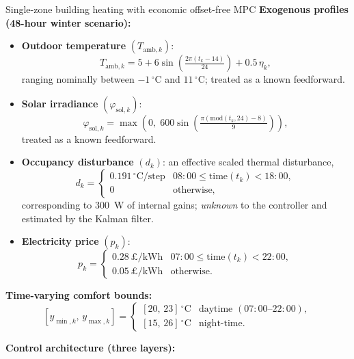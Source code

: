 \begin{examplebox}{Single-zone building heating with economic offset-free MPC}
\medskip
\textbf{Exogenous profiles (48-hour winter scenario):}
\begin{itemize}
	\item \textbf{Outdoor temperature} $(T_{\mathrm{amb},k})$:
	\[
	T_{\mathrm{amb},k} = 5 + 6\sin\!\left(\tfrac{2\pi(t_k-14)}{24}\right) + 0.5\,\eta_k,
	\]
	ranging nominally between $-1\,^\circ$C and $11\,^\circ$C; treated as
	a known feedforward.
	
	\item \textbf{Solar irradiance} $(\varphi_{\mathrm{sol},k})$:
	\[
	\varphi_{\mathrm{sol},k} = \max\!\left(0,\; 600\sin\!\left(\tfrac{\pi(\mathrm{mod}(t_k,24)-8)}{9}\right)\right),
	\]
	treated as a known feedforward.
	
	\item \textbf{Occupancy disturbance} $(d_k)$: an effective scaled thermal
	disturbance,
	\[
	d_k = \begin{cases} 0.191\,^\circ\text{C/step} & 08{:}00 \le \mathrm{time}(t_k) < 18{:}00, \\ 0 & \text{otherwise,} \end{cases}
	\]
	corresponding to 300~W of internal gains; \emph{unknown} to the
	controller and estimated by the Kalman filter.
	
	\item \textbf{Electricity price} $(p_k)$:
	\[
	p_k = \begin{cases} 0.28\,\pounds/\text{kWh} & 07{:}00 \le \mathrm{time}(t_k) < 22{:}00, \\ 0.05\,\pounds/\text{kWh} & \text{otherwise.} \end{cases}
	\]
\end{itemize}

\textbf{Time-varying comfort bounds:}
\[
[y_{\min,k},\,y_{\max,k}] = \begin{cases} [20,\,23]\,^\circ\text{C} & \text{daytime }(07{:}00\text{--}22{:}00), \\ [15,\,26]\,^\circ\text{C} & \text{night-time.}\end{cases}
\]

\medskip
\textbf{Control architecture (three layers):}

\begin{enumerate}
	

\end{enumerate}
\end{examplebox}
